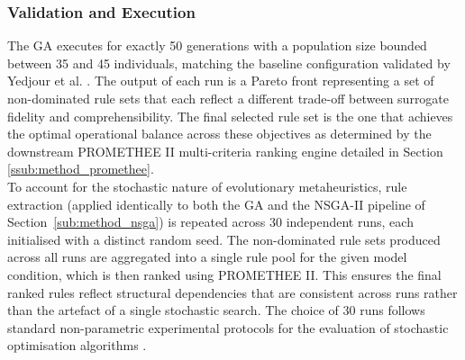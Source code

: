 \subsubsection{Validation and Execution}
\label{ssub:method_ga_validation}
The GA executes for exactly 50 generations with a population size bounded between 
35 and 45 individuals, matching the baseline configuration validated by Yedjour 
et al. \cite{Yedjour2024}. The output of each run is a Pareto front representing 
a set of non-dominated rule sets that each reflect a different trade-off between 
surrogate fidelity and comprehensibility. The final selected rule set is the one 
that achieves the optimal operational balance across these objectives as 
determined by the downstream PROMETHEE II multi-criteria ranking engine detailed 
in Section \ref{ssub:method_promethee}. 
\\
To account for the stochastic nature of evolutionary metaheuristics, rule
extraction (applied identically to both the GA and the NSGA-II pipeline of
Section~\ref{sub:method_nsga}) is repeated across 30 independent runs, each initialised with a
distinct random seed. The non-dominated rule sets produced across all runs are 
aggregated into a single rule pool for the given model condition, which is then 
ranked using PROMETHEE II. This ensures the final ranked rules reflect structural 
dependencies that are consistent across runs rather than the artefact of a 
single stochastic search. The choice of 30 runs follows standard non-parametric 
experimental protocols for the evaluation of stochastic optimisation algorithms 
\cite{Derrac2011}.